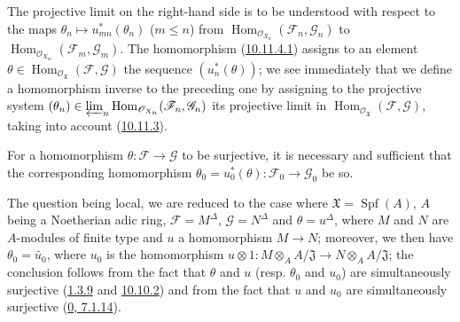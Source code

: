 The projective limit on the right-hand side is to be understood with
respect to the maps
$\theta_n\mapsto u_{mn}^*(\theta_n)$ ($m\leq n$) from
$\operatorname{Hom}_{\mathscr{O}_{X_n}}
(\mathscr{F}_n,\mathscr{G}_n)$ to
$\operatorname{Hom}_{\mathscr{O}_{X_m}}
(\mathscr{F}_m,\mathscr{G}_m)$. The homomorphism
(\hyperref[I.10.11.4.1]{10.11.4.1}) assigns to an element
$\theta\in\operatorname{Hom}_{\mathscr{O}_{\mathfrak{X}}}
(\mathscr{F},\mathscr{G})$ the sequence $(u_n^*(\theta))$; we see
immediately that we define a homomorphism inverse to the preceding one by
assigning to the projective system
$(\theta_n)\in\varprojlim_n
\operatorname{Hom}_{\mathscr{O}_{X_n}}
(\mathscr{F}_n,\mathscr{G}_n)$
its projective limit in
$\operatorname{Hom}_{\mathscr{O}_{\mathfrak{X}}}
(\mathscr{F},\mathscr{G})$, taking into account
(\hyperref[I.10.11.3]{10.11.3}).

\begin{corollary}[10.11.5]
\label{I.10.11.5}
For a homomorphism $\theta:\mathscr{F}\to\mathscr{G}$ to be
surjective, it is necessary and sufficient that the corresponding homomorphism
$\theta_0=u_0^*(\theta):\mathscr{F}_0\to\mathscr{G}_0$ be so.
\end{corollary}

The question being local, we are reduced to the case where
$\mathfrak{X}=\operatorname{Spf}(A)$, $A$ being a Noetherian adic ring,
$\mathscr{F}=M^\Delta$, $\mathscr{G}=N^\Delta$ and $\theta=u^\Delta$,
where $M$ and $N$ are $A$-modules of finite type and $u$ a
homomorphism $M\to N$; moreover, we then have
$\theta_0=\widetilde{u_0}$, where $u_0$ is the homomorphism
$u\otimes1:M\otimes_A A/\mathfrak{J}\to
N\otimes_A A/\mathfrak{J}$;
the conclusion follows from the fact that $\theta$ and $u$ (resp. $\theta_0$ and
$u_0$) are simultaneously surjective
(\hyperref[I.1.3.9]{1.3.9} and
\hyperref[I.10.10.2]{10.10.2}) and from the fact that $u$ and $u_0$ are
simultaneously surjective (\hyperref[0.7.1.14]{0, 7.1.14}).

